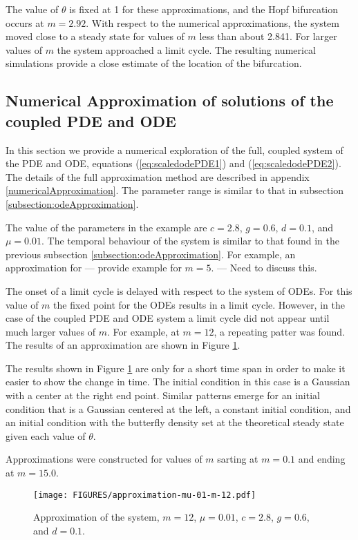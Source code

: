 \documentclass[review,authoryear]{elsarticle}
\begin{document}
The value of $\theta$ is fixed at 1 for these approximations, and the Hopf bifurcation occurs at $m=2.92$. With respect to the numerical approximations, the system moved close to a steady state for values of $m$ less than about 2.841. For larger values of $m$ the system approached a limit
cycle. The resulting numerical simulations provide a close estimate of the location of the bifurcation.

\subsection{Numerical Approximation of solutions of the coupled PDE and ODE}

In this section we provide a  numerical exploration of the full, coupled system of the PDE and
ODE, equations (\ref{eq:scaledodePDE1}) and (\ref{eq:scaledodePDE2}). The details of the full approximation method are
described in appendix \ref{numericalApproximation}. The parameter
range is similar to that in subsection
\ref{subsection:odeApproximation}.

The value of the parameters in the example are $c=2.8$, $g=0.6$,
$d=0.1$, and $\mu=0.01$. The temporal behaviour of the system is
similar to that found in the previous subsection
\ref{subsection:odeApproximation}. For example, an approximation for
--- provide example for $m=5$. --- Need to discuss this.

The onset of a limit cycle is delayed with respect to the system of
ODEs. For this value of $m$ the fixed point for the ODEs results in a
limit cycle. However, in the case of the coupled PDE and ODE system a
limit cycle did not appear until much larger values of $m$. For
example, at $m=12$, a repeating patter was found. The results of an
approximation are shown in Figure \ref{fig:approximationM12Mu01}.

The results shown in Figure \ref{fig:approximationM12Mu01} are only
for a short time span in order to make it easier to show the change in
time. The initial condition in this case is a Gaussian with a center
at the right end point.  Similar patterns emerge for an initial
condition that is a Gaussian centered at the left, a constant initial
condition, and an initial condition with the butterfly density set at
the theoretical steady state given each value of $\theta$.


Approximations were constructed for
values of $m$ sarting at $m=0.1$ and ending at $m=15.0$.


\begin{figure}[htb]
  \centering
  \texttt{[image: FIGURES/approximation-mu-01-m-12.pdf]}
  \caption[Approximation with $m=12$ and $\mu=0.01$.]{Approximation of
    the system, $m=12$, $\mu=0.01$, $c=2.8$, $g=0.6$, and $d=0.1$. }
  \label{fig:approximationM12Mu01}
\end{figure}
\end{document}

